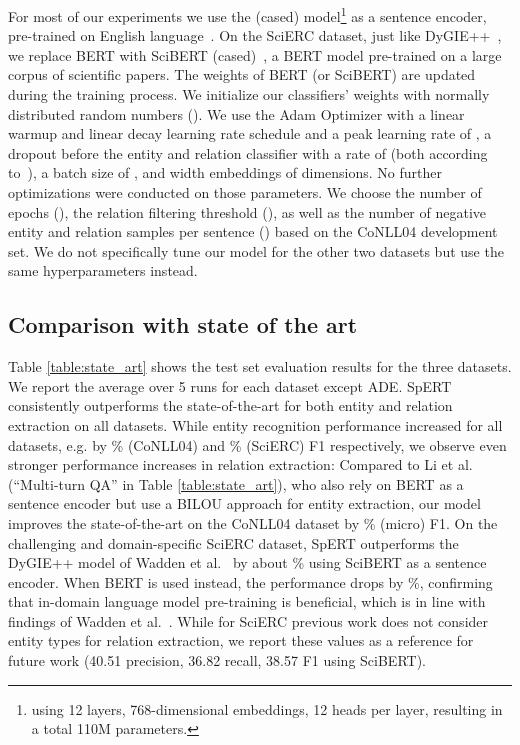 \documentclass{ecai}
\begin{document}
For most of our experiments we use the  (cased) model\footnote{using 12 layers, 768-dimensional embeddings, 12 heads per layer, resulting in a total 110M parameters.} as a sentence encoder, pre-trained on English language~\cite{devlin:2018:bert}. On the SciERC dataset, just like DyGIE++~\cite{wadden:2019:dygie++}, we replace BERT with SciBERT (cased)~\cite{beltagy:2019:scibert}, a BERT model pre-trained on a large corpus of scientific papers. The weights of BERT (or SciBERT) are updated during the training process.
We initialize our classifiers' weights with normally distributed random numbers ().
We use the Adam Optimizer with a linear warmup and linear decay learning rate schedule and a peak learning rate of , a dropout before the entity and relation classifier with a rate of  (both according to~\cite{devlin:2018:bert}), a batch size of , and width embeddings  of  dimensions. No further optimizations were conducted on those parameters. We choose the number of epochs (), the relation filtering threshold (), as well as the number of negative entity and relation samples per sentence () based on the CoNLL04 development set. We do not specifically tune our model for the other two datasets but use the same hyperparameters instead.

\subsection{Comparison with state of the art}

Table \ref{table:state_art} shows the test set evaluation results for the three datasets. We report the average over 5 runs for each dataset except ADE. SpERT consistently outperforms the state-of-the-art for both entity and relation extraction on all datasets. While entity recognition performance increased for all datasets, e.g. by \% (CoNLL04) and \% (SciERC) F1 respectively, we observe even stronger performance increases in relation extraction: Compared to Li et al. ~\cite{li:2019:joint_bert} (\enquote{Multi-turn QA} in Table \ref{table:state_art}), who also rely on BERT as a sentence encoder but use a BILOU approach for entity extraction, our model improves the state-of-the-art on the CoNLL04 dataset by \% (micro) F1. 
On the challenging and domain-specific SciERC dataset, SpERT outperforms 
the DyGIE++ model of Wadden et al.~\cite{wadden:2019:dygie++} by about \% using SciBERT as a sentence encoder. When BERT is used instead, the performance drops by \%, confirming that in-domain language model pre-training is beneficial, which is in line with findings of Wadden et al.~\cite{wadden:2019:dygie++}. While for SciERC previous work does not consider entity types for relation extraction, we report these values as a reference for future work (40.51 precision, 36.82 recall, 38.57 F1 using SciBERT). 
\end{document}
